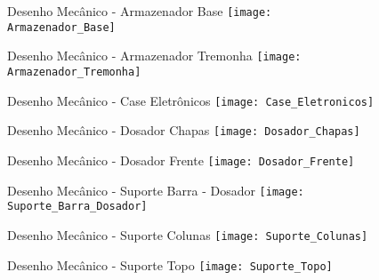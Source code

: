 \begin{figure}
\centering
Desenho Mecânico - Armazenador Base
\texttt{[image: Armazenador\_Base]}
\linebreak
\end{figure}

\begin{figure}
\centering
Desenho Mecânico - Armazenador Tremonha
\texttt{[image: Armazenador\_Tremonha]}
\linebreak
\end{figure}

\begin{figure}
\centering
Desenho Mecânico - Case Eletrônicos
\texttt{[image: Case\_Eletronicos]}
\linebreak
\end{figure}

\begin{figure}
\centering
Desenho Mecânico - Dosador Chapas
\texttt{[image: Dosador\_Chapas]}
\linebreak
\end{figure}

\begin{figure}
\centering
Desenho Mecânico - Dosador Frente
\texttt{[image: Dosador\_Frente]}
\linebreak
\end{figure}

\begin{figure}
\centering
Desenho Mecânico - Suporte Barra - Dosador
\texttt{[image: Suporte\_Barra\_Dosador]}
\linebreak
\end{figure}

\begin{figure}
\centering
Desenho Mecânico - Suporte Colunas
\texttt{[image: Suporte\_Colunas]}
\linebreak
\end{figure}

\begin{figure}
\centering
Desenho Mecânico - Suporte Topo
\texttt{[image: Suporte\_Topo]}
\linebreak
\end{figure}
